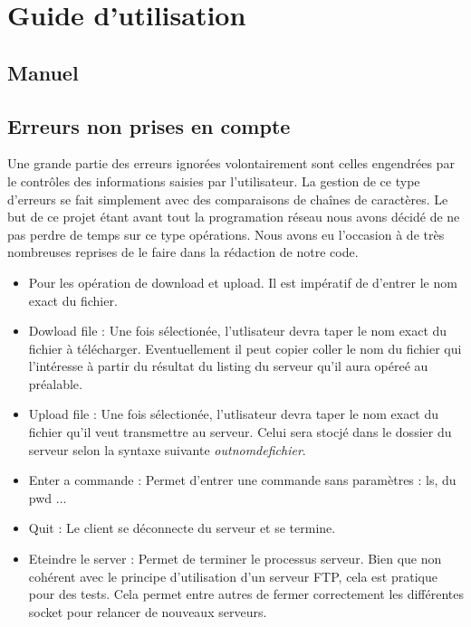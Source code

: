 \chapter{Guide d'utilisation}
\section{Manuel}
\section{Erreurs non prises en compte}
Une grande partie des erreurs ignorées volontairement sont celles engendrées par le contrôles des informations saisies par l'utilisateur. La gestion de ce type  d'erreurs se fait simplement avec des comparaisons de chaînes de caractères. Le but de ce projet étant avant tout la programation réseau nous avons décidé de ne pas perdre de temps sur ce type opérations. Nous avons eu l'occasion à de très nombreuses reprises de le faire dans la rédaction de notre code. 
\begin{itemize}
\item
Pour les opération de download et upload. Il est impératif de d'entrer le nom exact du fichier. 
\item
Dowload file  : Une fois sélectionée, l'utlisateur devra taper le nom exact du fichier à télécharger. Eventuellement il peut copier coller le nom du fichier qui l'intéresse à partir du résultat du listing du serveur qu'il aura opéreé au préalable.
\item
Upload file : Une fois sélectionée, l'utlisateur devra taper le nom exact du fichier qu'il veut transmettre au serveur. Celui sera stocjé dans le dossier du serveur selon la syntaxe suivante \textit{outnomdefichier}.
\item
Enter a commande : Permet d'entrer une commande sans paramètres : ls, du pwd ...
\item
Quit : Le client se déconnecte du serveur et se termine.
\item
Eteindre le server : Permet de terminer le processus serveur. Bien que non cohérent avec le principe d'utilisation d'un serveur FTP, cela est pratique pour des tests. Cela permet entre autres de fermer correctement les différentes socket pour relancer de nouveaux serveurs.
\end{itemize}


